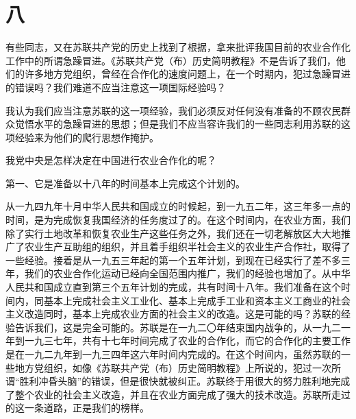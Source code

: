 \section*{八}

有些同志，又在苏联共产党的历史上找到了根据，拿来批评我国目前的农业合作化工作中的所谓急躁冒进。《苏联共产党（布）历史简明教程》不是告诉了我们，他们的许多地方党组织，曾经在合作化的速度问题上，在一个时期内，犯过急躁冒进的错误吗？我们难道不应当注意这一项国际经验吗？

我认为我们应当注意苏联的这一项经验，我们必须反对任何没有准备的不顾农民群众觉悟水平的急躁冒进的思想；但是我们不应当容许我们的一些同志利用苏联的这项经验来为他们的爬行思想作掩护。

我党中央是怎样决定在中国进行农业合作化的呢？

第一、它是准备以十八年的时间基本上完成这个计划的。

从一九四九年十月中华人民共和国成立的时候起，到一九五二年，这三年多一点的时间，是为完成恢复我国经济的任务度过了的。在这个时间内，在农业方面，我们除了实行土地改革和恢复农业生产这些任务之外，我们还在一切老解放区大大地推广了农业生产互助组的组织，并且着手组织半社会主义的农业生产合作社，取得了一些经验。接着是从一九五三年起的第一个五年计划，到现在已经实行了差不多三年，我们的农业合作化运动已经向全国范围内推广，我们的经验也增加了。从中华人民共和国成立直到第三个五年计划的完成，共有时间十八年。我们准备在这个时间内，同基本上完成社会主义工业化、基本上完成手工业和资本主义工商业的社会主义改造同时，基本上完成农业方面的社会主义的改造。这是可能的吗？苏联的经验告诉我们，这是完全可能的。苏联是在一九二〇年结束国内战争的，从一九二一年到一九三七年，共有十七年时间完成了农业的合作化，而它的合作化的主要工作是在一九二九年到一九三四年这六年时间内完成的。在这个时间内，虽然苏联的一些地方党组织，如像《苏联共产党（布）历史简明教程》上所说的，犯过一次所谓“胜利冲昏头脑”的错误，但是很快就被纠正。苏联终于用很大的努力胜利地完成了整个农业的社会主义改造，并且在农业方面完成了强大的技术改造。苏联所走过的这一条道路，正是我们的榜样。

